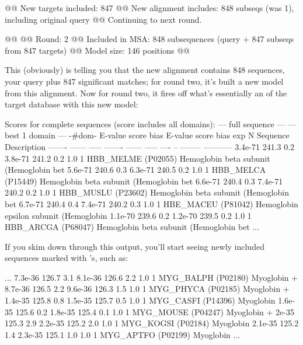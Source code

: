 \begin{sreoutput}
@@ New targets included:   847
@@ New alignment includes: 848 subseqs (was 1), including original query
@@ Continuing to next round.

@@
@@ Round:                  2
@@ Included in MSA:        848 subsequences (query + 847 subseqs from 847 targets)
@@ Model size:             146 positions
@@
\end{sreoutput}

This (obviously) is telling you that the new alignment contains 848
sequences, your query plus 847 significant matches; for round two,
it's built a new model from this alignment. Now for round two, it
fires off what's essentially an  of the target
database with this new model:

\begin{sreoutput}
Scores for complete sequences (score includes all domains):
   --- full sequence ---   --- best 1 domain ---    -#dom-
    E-value  score  bias    E-value  score  bias    exp  N  Sequence    Description
    ------- ------ -----    ------- ------ -----   ---- --  --------    -----------
    3.4e-71  241.3   0.2    3.8e-71  241.2   0.2    1.0  1  HBB_MELME   (P02055) Hemoglobin beta subunit (Hemoglobin bet
    5.6e-71  240.6   0.3    6.3e-71  240.5   0.2    1.0  1  HBB_MELCA   (P15449) Hemoglobin beta subunit (Hemoglobin bet
    6.6e-71  240.4   0.3    7.4e-71  240.2   0.2    1.0  1  HBB_MUSLU   (P23602) Hemoglobin beta subunit (Hemoglobin bet
    6.7e-71  240.4   0.4    7.4e-71  240.2   0.3    1.0  1  HBE_MACEU   (P81042) Hemoglobin epsilon subunit (Hemoglobin 
    1.1e-70  239.6   0.2    1.2e-70  239.5   0.2    1.0  1  HBB_ARCGA   (P68047) Hemoglobin beta subunit (Hemoglobin bet
...
\end{sreoutput}

If you skim down through this output, you'll start seeing newly
included sequences marked with \ccode{+}'s, such as:

\begin{sreoutput}
...
    7.3e-36  126.7   3.1    8.1e-36  126.6   2.2    1.0  1  MYG_BALPH   (P02180) Myoglobin
+   8.7e-36  126.5   2.2    9.6e-36  126.3   1.5    1.0  1  MYG_PHYCA   (P02185) Myoglobin
+   1.4e-35  125.8   0.8    1.5e-35  125.7   0.5    1.0  1  MYG_CASFI   (P14396) Myoglobin
    1.6e-35  125.6   0.2    1.8e-35  125.4   0.1    1.0  1  MYG_MOUSE   (P04247) Myoglobin
+     2e-35  125.3   2.9    2.2e-35  125.2   2.0    1.0  1  MYG_KOGSI   (P02184) Myoglobin
    2.1e-35  125.2   1.4    2.3e-35  125.1   1.0    1.0  1  MYG_APTFO   (P02199) Myoglobin
...
\end{sreoutput}

